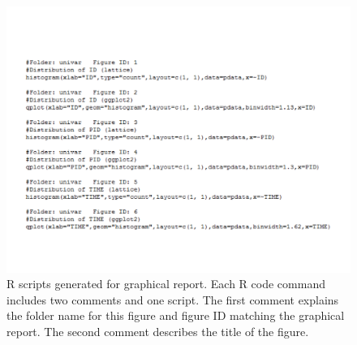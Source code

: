 \documentclass[a4paper]{article}
\begin{document}
\begin{figure}[h!tb] \centering
\includegraphics[scale=0.5]{c2_s2_5code.pdf}
\caption{R scripts generated for graphical report. Each R code command includes two comments and one
script. The first comment explains the folder name for this figure
and figure ID matching the graphical report. The second
comment describes the title of the figure.} 
\label{c2_s2_5code}
\end{figure}
\end{document}
